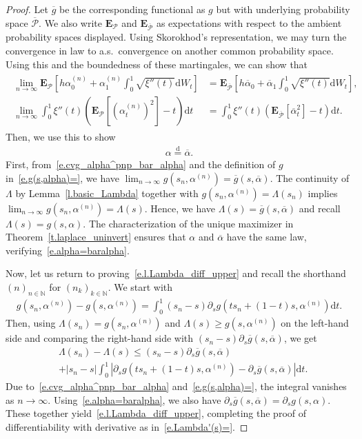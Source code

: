 \documentclass[11pt]{amsart}
\theoremstyle{remark}
\theoremstyle{definition}
\numberwithin{equation}{section}
\numberwithin{proposition}{section}
\numberwithin{figure}{section}
\numberwithin{table}{section}
\newcommand{\N}{\mathbb{N}}
\newcommand{\EE}{\mathbf{E}}
\renewcommand{\leq}{\leqslant}
\renewcommand{\geq}{\geqslant}
\renewcommand{\bar}{\overline}
\newcommand{\Ll}{\left}
\newcommand{\Rr}{\right}
\renewcommand{\d}{\mathrm{d}}
\newcommand{\1}{\mathbf{1}}
\newcommand{\msc}{\mathscr}
\newcommand{\pnp}{{(n)}}
\begin{document}
\begin{proof}
Let $\bar g$ be the corresponding functional as $g$ but with underlying probability space $\bar{\msc P}$. We also write $\EE_{\msc P}$ and $\EE_{\bar{\msc P}}$ as expectations with respect to the ambient probability spaces displayed. Using Skorokhod's representation, we may turn the convergence in law to a.s.\ convergence on another common probability space. Using this and the boundedness of these martingales, we can show that
\begin{align}\label{e.cvg_alpha^pnp_bar_alpha}
\begin{split}
    \lim_{n\to\infty}\EE_{\msc P}\Ll[h\alpha^\pnp_0 + \alpha^\pnp_1\int_0^1\sqrt{\xi''(t)}\d W_t\Rr] & = \EE_{\bar{\msc P}}\Ll[h\bar\alpha_0 + \bar\alpha_1\int_0^1\sqrt{\xi''(t)}\d W_t\Rr],
    \\
    \lim_{n\to\infty}\int_0^1 \xi''(t)\Ll(\EE_{\msc P}\Ll[\Ll(\alpha_t^\pnp\Rr)^2\Rr] -t \Rr)\d t &= \int_0^1 \xi''(t)\Ll(\EE_{\bar{\msc P}}\Ll[\bar\alpha_t^2\Rr] -t \Rr)\d t.
\end{split}
\end{align}
Then, we use this to show
\begin{align}\label{e.alpha=baralpha}
    \alpha \stackrel{\d}{=}\bar\alpha.
\end{align}
First, from~\eqref{e.cvg_alpha^pnp_bar_alpha} and the definition of $g$ in~\eqref{e.g(s,alpha)=}, we have $\lim_{n\to\infty}g(s_n,\alpha^\pnp) = \bar g(s,\bar\alpha)$.
The continuity of $\Lambda$ by Lemma~\ref{l.basic_Lambda} together with $g(s_n,\alpha^\pnp)= \Lambda(s_n)$ implies $\lim_{n\to\infty}g(s_n,\alpha^\pnp) = \Lambda(s)$. Hence, we have $\Lambda(s)= \bar g(s,\bar\alpha)$ and recall $\Lambda(s)=g(s,\alpha)$. The characterization of the unique maximizer in Theorem~\ref{t.laplace_uninvert} ensures that $\alpha$ and $\bar\alpha$ have the same law, verifying~\eqref{e.alpha=baralpha}.

Now, let us return to proving~\eqref{e.l.Lambda_diff_upper} and recall the shorthand $(n)_{n\in\N}$ for $(n_k)_{k\in\N}$.
We start with
\begin{align*}
    g\Ll(s_n,\alpha^\pnp\Rr)- g\Ll(s,\alpha^\pnp\Rr) =\int_0^1(s_n-s)\partial_sg\Ll(ts_n+(1-t)s,\alpha^\pnp\Rr)\d t.
\end{align*}
Then, using $\Lambda(s_n)= g\Ll(s_n,\alpha^\pnp\Rr)$ and $\Lambda(s)\geq g\Ll(s,\alpha^\pnp\Rr)$ on the left-hand side and comparing the right-hand side with $(s_n-s)\partial_s \bar g(s,\bar\alpha)$, we get
\begin{align*}
    &\Lambda(s_n)-\Lambda(s) \leq (s_n-s)\partial_s \bar g(s,\bar\alpha) 
    \\
    & + |s_n-s|\int_0^1 \Ll|\partial_sg\Ll(ts_n+(1-t)s,\alpha^\pnp\Rr) - \partial_s \bar g(s, \bar\alpha)\Rr|\d t.
\end{align*}
Due to~\eqref{e.cvg_alpha^pnp_bar_alpha} and~\eqref{e.g(s,alpha)=}, the integral vanishes as $n\to\infty$. Using~\eqref{e.alpha=baralpha}, we also have $ \partial_s \bar g(s, \bar\alpha) = \partial_s g(s,\alpha)$. These together yield~\eqref{e.l.Lambda_diff_upper}, completing the proof of differentiability with derivative as in~\eqref{e.Lambda'(s)=}.


\end{proof}
\end{document}
